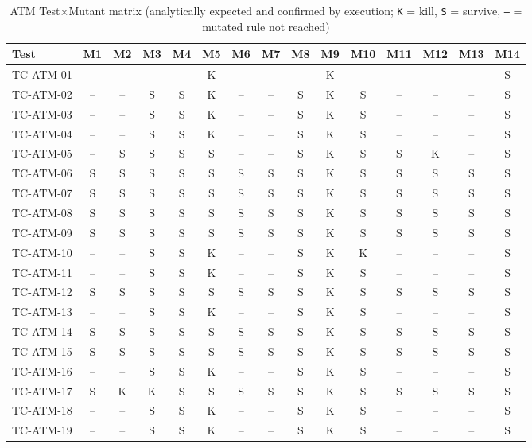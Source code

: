 \documentclass[11pt,a4paper]{article}
\begin{document}
\begin{table}[H]
\centering
\caption{ATM Test\(\times\)Mutant matrix (analytically expected and confirmed by execution; \texttt{K} = kill, \texttt{S} = survive, \texttt{--} = mutated rule not reached)}
\label{tab:atm-matrix}
\scriptsize
\setlength{\tabcolsep}{2.6pt}
\begin{tabular}{lcccccccccccccc}
\toprule
Test & M1 & M2 & M3 & M4 & M5 & M6 & M7 & M8 & M9 & M10 & M11 & M12 & M13 & M14 \\
\midrule
TC-ATM-01 & -- & -- & -- & -- & K & -- & -- & -- & K & -- & -- & -- & -- & S \\
TC-ATM-02 & -- & -- & S & S & K & -- & -- & S & K & S & -- & -- & -- & S \\
TC-ATM-03 & -- & -- & S & S & K & -- & -- & S & K & S & -- & -- & -- & S \\
TC-ATM-04 & -- & -- & S & S & K & -- & -- & S & K & S & -- & -- & -- & S \\
TC-ATM-05 & -- & S & S & S & S & -- & -- & S & K & S & S & K & -- & S \\
TC-ATM-06 & S & S & S & S & S & S & S & S & K & S & S & S & S & S \\
TC-ATM-07 & S & S & S & S & S & S & S & S & K & S & S & S & S & S \\
TC-ATM-08 & S & S & S & S & S & S & S & S & K & S & S & S & S & S \\
TC-ATM-09 & S & S & S & S & S & S & S & S & K & S & S & S & S & S \\
\midrule
TC-ATM-10 & -- & -- & S & S & K & -- & -- & S & K & K & -- & -- & -- & S \\
TC-ATM-11 & -- & -- & S & S & K & -- & -- & S & K & S & -- & -- & -- & S \\
TC-ATM-12 & S & S & S & S & S & S & S & S & K & S & S & S & S & S \\
TC-ATM-13 & -- & -- & S & S & K & -- & -- & S & K & S & -- & -- & -- & S \\
TC-ATM-14 & S & S & S & S & S & S & S & S & K & S & S & S & S & S \\
TC-ATM-15 & S & S & S & S & S & S & S & S & K & S & S & S & S & S \\
TC-ATM-16 & -- & -- & S & S & K & -- & -- & S & K & S & -- & -- & -- & S \\
TC-ATM-17 & S & K & K & S & S & S & S & S & K & S & S & S & S & S \\
TC-ATM-18 & -- & -- & S & S & K & -- & -- & S & K & S & -- & -- & -- & S \\
TC-ATM-19 & -- & -- & S & S & K & -- & -- & S & K & S & -- & -- & -- & S \\

\end{tabular}
\end{table}
\end{document}

